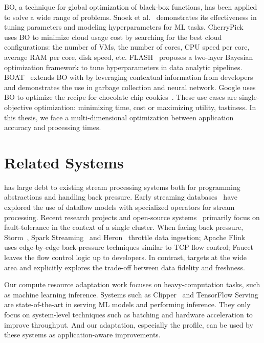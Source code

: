 \documentclass[thesis.tex]{subfiles}
\begin{document}
BO, a technique for global optimization of black-box functions, has been applied
to solve a wide range of problems. Snoek et al.~\cite{snoek2012practical}
demonstrates its effectiveness in tuning parameters and modeling hyperparameters
for ML tasks. CherryPick~\cite{alipourfard2017cherrypick} uses BO to minimize
cloud usage cost by searching for the best cloud configurations: the number of
VMs, the number of cores, CPU speed per core, average RAM per core, disk speed,
etc. FLASH~\cite{zhang2016flash} proposes a two-layer Bayesian optimization
framework to tune hyperparameters in data analytic
pipelines. BOAT~\cite{dalibard2017boat} extends BO with by leveraging contextual
information from developers and demonstrates the use in garbage collection and
neural network. Google uses BO to optimize the recipe for chocolate chip
cookies~\cite{solnik2017bayesian}. These use cases are single-objective
optimization: minimizing time, cost or maximizing utility, tastiness. In this
thesis, we face a multi-dimensional optimization between application accuracy
and processing times.

\section{Related Systems}
\label{sec:related-systems}

\awstream{} has large debt to existing stream processing systems both for
programming abstractions and handling back pressure. Early streaming
databases~\cite{abadi2005design, chandrasekaran2003telegraphcq} have explored
the use of dataflow models with specialized operators for stream
processing. Recent research projects and open-source
systems~\cite{akidau2013millwheel, toshniwal2014storm, sanjeev2015twitter,
  zaharia2013discretized, carbone2015apache} primarily focus on fault-tolerance
in the context of a single cluster. When facing back pressure,
Storm~\cite{toshniwal2014storm}, Spark Streaming~\cite{zaharia2013discretized}
and Heron~\cite{sanjeev2015twitter} throttle data ingestion; Apache
Flink~\cite{carbone2015apache} uses edge-by-edge back-pressure techniques
similar to TCP flow control; Faucet~\cite{lattuada2016faucet} leaves the flow
control logic up to developers. In contrast, \awstream{} targets at the wide
area and explicitly explores the trade-off between data fidelity and freshness.

Our compute resource adaptation work focuses on heavy-computation tasks, such as
machine learning inference. Systems such as Clipper~\cite{crankshaw2017clipper}
and TensorFlow Serving~\cite{tensorflow2017serving} are state-of-the-art in
serving ML models and performing inference. They only focus on system-level
techniques such as batching and hardware acceleration to improve throughput. And
our adaptation, especially the profile, can be used by these systems as
application-aware improvements.
\end{document}
